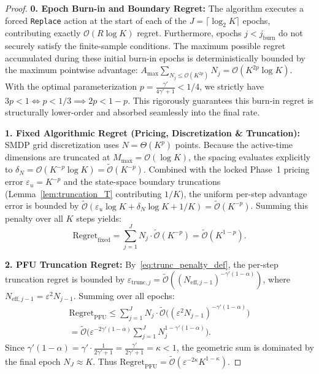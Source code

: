 \documentclass[letterpaper, 10 pt, conference]{IEEEconf}
\begin{document}
\begin{proof}
    \noindent \textbf{0. Epoch Burn-in and Boundary Regret:}
    The algorithm executes a forced \texttt{Replace} action at the start of each of the $J = \lceil \log_2 K \rceil$ epochs, contributing exactly $\mathcal{O}(R \log K)$ regret. Furthermore, epochs $j < j_{\mathrm{burn}}$ do not securely satisfy the finite-sample conditions. The maximum possible regret accumulated during these initial burn-in epochs is deterministically bounded by the maximum pointwise advantage: $A_{\max} \sum_{N_j \le \mathcal{O}(K^{2p})} N_j = \mathcal{O}(K^{2p} \log K)$. With the optimal parameterization $p = \frac{\gamma'}{4\gamma'+1} < 1/4$, we strictly have $3p < 1 \iff p < 1/3 \implies 2p < 1-p$. This rigorously guarantees this burn-in regret is structurally lower-order and absorbed seamlessly into the final rate.

    \noindent \textbf{1. Fixed Algorithmic Regret (Pricing, Discretization \& Truncation):}
    SMDP grid discretization uses $N = \Theta(K^p)$ points. Because the active-time dimensions are truncated at $M_{\max} = \mathcal{O}(\log K)$, the spacing evaluates explicitly to $\delta_N = \mathcal{O}(K^{-p} \log K) = \widetilde{\mathcal{O}}(K^{-p})$. Combined with the locked Phase~1 pricing error $\varepsilon_u = K^{-p}$ and the state-space boundary truncations (Lemma~\ref{lem:truncation_T} contributing $1/K$), the uniform per-step advantage error is bounded by $\widetilde{\mathcal{O}}(\varepsilon_u \log K + \delta_N \log K + 1/K) = \widetilde{\mathcal{O}}(K^{-p})$. Summing this penalty over all $K$ steps yields:
    \begin{equation}
        \mathrm{Regret}_{\mathrm{fixed}} = \sum_{j=1}^J N_j \cdot \widetilde{\mathcal{O}}(K^{-p}) = \widetilde{\mathcal{O}}(K^{1-p}).
    \end{equation}

    \noindent \textbf{2. PFU Truncation Regret:}
    By~\eqref{eq:trunc_penalty_def}, the per-step truncation regret is bounded by $\varepsilon_{\mathrm{trunc},j} = \widetilde{\mathcal{O}}((N_{\mathrm{eff},j-1})^{-\gamma'(1-\alpha)})$, where $N_{\mathrm{eff},j-1} = \varepsilon^2 N_{j-1}$. Summing over all epochs:
    \begin{multline}
        \mathrm{Regret}_{\mathrm{PFU}} \le \sum_{j=1}^J N_j \cdot \widetilde{\mathcal{O}}\big((\varepsilon^2 N_{j-1})^{-\gamma'(1-\alpha)}\big) \\
        = \widetilde{\mathcal{O}}\bigg(\varepsilon^{-2\gamma'(1-\alpha)} \sum_{j=1}^J N_j^{1-\gamma'(1-\alpha)}\bigg).
    \end{multline}
    Since $\gamma'(1-\alpha) = \gamma' \cdot \frac{1}{2\gamma'+1} = \frac{\gamma'}{2\gamma'+1} = \kappa < 1$, the geometric sum is dominated by the final epoch $N_J \approx K$. Thus $\mathrm{Regret}_{\mathrm{PFU}} = \widetilde{\mathcal{O}}(\varepsilon^{-2\kappa} K^{1-\kappa})$.


\end{proof}
\end{document}
